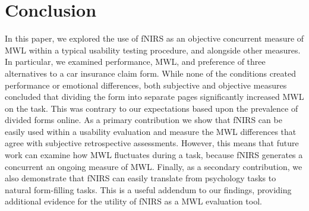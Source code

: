\documentclass[../main/Replicate.tex]{subfiles}
\begin{document}
	\section{Conclusion}
	In this paper, we explored the use of fNIRS as an objective concurrent measure of MWL within a typical usability testing procedure, and alongside other measures. In particular, we examined performance, MWL, and preference of three alternatives to a car insurance claim form. %
	While none of the conditions created performance or emotional differences, both subjective and objective measures concluded that dividing the form into separate pages significantly increased MWL on the task. This was contrary to our expectations based upon the prevalence of divided forms online. As a primary contribution we show that fNIRS can be easily used within a usability evaluation and measure the MWL differences that agree with subjective retrospective assessments. However, this means that future work can examine how MWL fluctuates during a task, because fNIRS generates a concurrent an ongoing measure of MWL. Finally, as a secondary contribution, we also demonstrate that fNIRS can easily translate from psychology tasks to natural form-filling tasks. This is a useful addendum to our findings, providing additional evidence for the utility of fNIRS as a MWL evaluation tool.
\\
\end{document}
